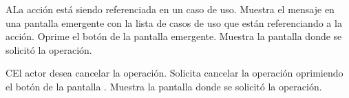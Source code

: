  \begin{UCtrayectoriaA}{A}{La acción está siendo referenciada en un caso de uso.}
    \UCpaso[\UCsist] Muestra el mensaje  en una pantalla emergente
    con la lista de casos de uso que están referenciando a la acción.
    \UCpaso[\UCactor] Oprime el botón  de la pantalla emergente.
    \UCpaso[\UCsist] Muestra la pantalla donde se solicitó la operación.
 \end{UCtrayectoriaA}
 \begin{UCtrayectoriaA}{C}{El actor desea cancelar la operación.}
    \UCpaso[\UCactor] Solicita cancelar la operación oprimiendo el botón  de la pantalla .
    \UCpaso[\UCsist] Muestra la pantalla donde se solicitó la operación.
 \end{UCtrayectoriaA} 